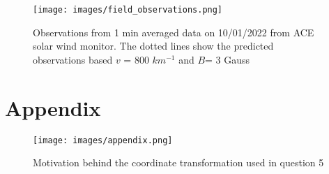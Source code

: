 \documentclass[letterpaper,skipsamekey,12pt,english]{article}
\begin{document}
\begin{figure}[h]
    \centering
    \texttt{[image: images/field\_observations.png]}
    \caption{Observations from 1 min averaged data on 10/01/2022 from ACE solar wind monitor. The dotted lines show the predicted observations based $v$ =  800 $km^{-1}$ and $B$= 3 Gauss}
    \label{fig:ACE_observations}
\end{figure}



\printbibliography
 
 \section{Appendix}
 
 
 
 \begin{figure}[h]
     \centering
     \texttt{[image: images/appendix.png]}
     \caption{Motivation behind the coordinate transformation used in question 5}
 \end{figure}
\end{document}
